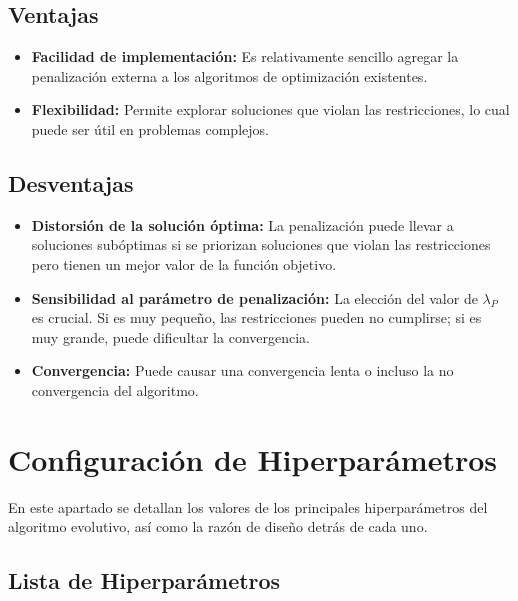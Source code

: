 \subsection*{Ventajas}

\begin{itemize}
    \item \textbf{Facilidad de implementación:} Es relativamente sencillo agregar la penalización externa a los algoritmos de optimización existentes.
    \item \textbf{Flexibilidad:} Permite explorar soluciones que violan las restricciones, lo cual puede ser útil en problemas complejos.
\end{itemize}

\subsection*{Desventajas}

\begin{itemize}
    \item \textbf{Distorsión de la solución óptima:} La penalización puede llevar a soluciones subóptimas si se priorizan soluciones que violan las restricciones pero tienen un mejor valor de la función objetivo.
    \item \textbf{Sensibilidad al parámetro de penalización:} La elección del valor de \( \lambda_P \) es crucial. Si es muy pequeño, las restricciones pueden no cumplirse; si es muy grande, puede dificultar la convergencia.
    \item \textbf{Convergencia:} Puede causar una convergencia lenta o incluso la no convergencia del algoritmo.
\end{itemize}

\section{Configuración de Hiperparámetros}
En este apartado se detallan los valores de los principales hiperparámetros del algoritmo evolutivo, así como la razón de diseño detrás de cada uno.

\subsection{Lista de Hiperparámetros}

